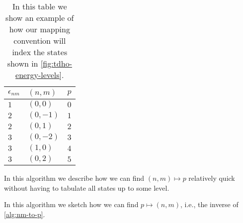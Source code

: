             \begin{table}
                \centering
                \caption{In this table we show an example of how our mapping
                convention will index the states shown in
                \autoref{fig:tdho-energy-levels}.}
                \renewcommand{\arraystretch}{1.3}
                \begin{tabular}{@{}lll@{}}
                    \toprule
                    $\epsilon_{nm}$ & $(n, m)$ & $p$ \\
                    \midrule
                    $1$ & $(0, 0)$ & $0$ \\
                    $2$ & $(0, -1)$ & $1$ \\
                    $2$ & $(0, 1)$ & $2$ \\
                    $3$ & $(0, -2)$ & $3$ \\
                    $3$ & $(1, 0)$ & $4$ \\
                    $3$ & $(0, 2)$ & $5$ \\
                    \bottomrule
                \end{tabular}
                \label{tab:tdho-mapping}
            \end{table}

            \begin{algorithm}
                \caption{In this algorithm we describe how we can find $(n, m)
                \mapsto p$ relatively quick without having to tabulate all
                states up to some level.}
                \label{alg:nm-to-p}
            \end{algorithm}

            \begin{algorithm}
                \caption{In this algorithm we sketch how we can find $p \mapsto
                (n, m)$, i.e., the inverse of \autoref{alg:nm-to-p}.}
                \label{alg:p-to-nm}
            \end{algorithm}

